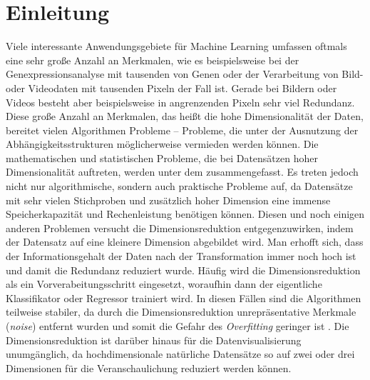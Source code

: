 \chapter{Einleitung}
\label{ch:Enleitung}

Viele interessante Anwendungsgebiete für Machine Learning umfassen oftmals eine sehr große Anzahl
an Merkmalen, wie es beispielsweise bei der Genexpressionsanalyse mit tausenden von Genen \parencite{Parmigiani.2003} oder der Verarbeitung von Bild- oder Videodaten mit tausenden Pixeln der
Fall ist. Gerade bei Bildern oder Videos besteht aber beispielsweise in angrenzenden Pixeln sehr
viel Redundanz. Diese große Anzahl an Merkmalen, das heißt die hohe Dimensionalität der Daten,
bereitet vielen Algorithmen Probleme -- Probleme, die unter der Ausnutzung der
Abhängigkeitsstrukturen möglicherweise vermieden werden können. Die mathematischen und
statistischen Probleme, die bei Datensätzen hoher Dimensionalität auftreten, werden unter dem
 \parencite{Aggarwal.2001} zusammengefasst. Es treten jedoch nicht nur algorithmische, sondern auch
praktische Probleme auf, da Datensätze mit sehr vielen Stichproben und zusätzlich hoher Dimension
eine immense Speicherkapazität und Rechenleistung benötigen können.
Diesen und noch einigen anderen Problemen versucht die Dimensionsreduktion entgegenzuwirken, indem
der Datensatz auf eine kleinere Dimension abgebildet wird. Man erhofft sich, dass der
Informationsgehalt der Daten nach der Transformation immer noch hoch ist und damit die Redundanz
reduziert wurde. Häufig wird die Dimensionsreduktion als ein Vorverabeitungsschritt eingesetzt,
woraufhin dann der eigentliche Klassifikator oder Regressor trainiert wird. In diesen Fällen sind
die Algorithmen teilweise stabiler, da durch die Dimensionsreduktion unrepräsentative Merkmale
(\textit{noise}) entfernt wurden und somit die Gefahr des \textit{Overfitting} geringer ist \parencites[siehe]{Plastria.2008}{MustafaAbdulSalam.2021}. Die Dimensionsreduktion ist darüber hinaus
für die Datenvisualisierung unumgänglich, da hochdimensionale natürliche Datensätze so auf zwei
oder drei Dimensionen für die Veranschaulichung reduziert werden können.

